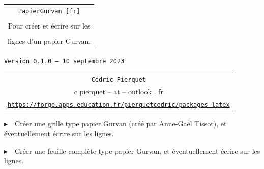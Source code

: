\documentclass[a4paper]{article}
\def\TPversion{0.1.0}
\def\TPdate{10 septembre 2023}
\begin{document}
\pagestyle{fancy}

\thispagestyle{empty}

\vspace{2cm}

\begin{center}
	\begin{minipage}{0.75\linewidth}
	\begin{tcolorbox}[colframe=yellow,colback=yellow!15]
		\begin{center}
			\begin{tabular}{c}
				{\Huge \texttt{PapierGurvan [fr]}}\\
				\\
				{\LARGE Pour créer et écrire sur les} \\
				\\
				{\LARGE lignes d'un papier Gurvan.}
			\end{tabular}
			
			\medskip
			
			{\small \texttt{Version \TPversion{} -- \TPdate}}
		\end{center}
	\end{tcolorbox}
\end{minipage}
\end{center}

\vspace{0.5cm}

\begin{center}
	\begin{tabular}{c}
	\texttt{Cédric Pierquet}\\
	{\ttfamily c pierquet -- at -- outlook . fr}\\
	\texttt{\url{https://forge.apps.education.fr/pierquetcedric/packages-latex}}
\end{tabular}
\end{center}

\vspace{0.5cm}

{$\blacktriangleright$~~Créer une grille type papier Gurvan (créé par Anne-Gaël Tissot), et éventuellement écrire sur les lignes.}

\smallskip

{$\blacktriangleright$~~Créer une feuille complète type papier Gurvan, et éventuellement écrire sur les lignes.}

\vspace{1cm}

\begin{center}
\begin{EnvGurvan}[NbCarreaux=17x5,Interligne=2.5]
\end{EnvGurvan}
\end{center}
\end{document}
